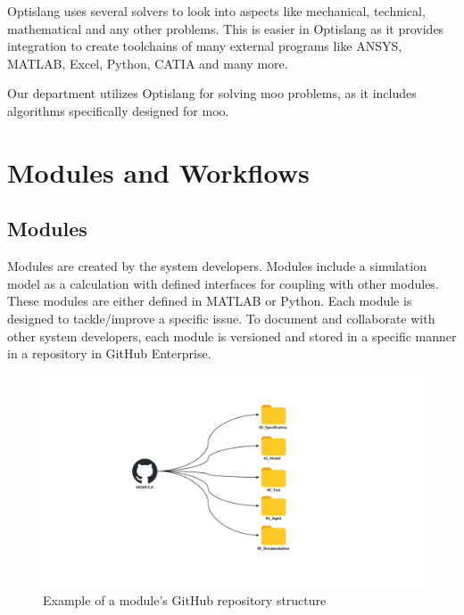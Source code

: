 Optislang uses several solvers to look into aspects like mechanical, technical, mathematical and any other problems. This is easier in Optislang as it provides
integration to create toolchains of many external programs like ANSYS, MATLAB, Excel, Python, CATIA and many more.


Our department utilizes Optislang for solving \acrshort{moo} problems, as it includes algorithms specifically designed for \acrshort{moo}.
\section{Modules and Workflows}
\subsection{Modules}
Modules are created by the system developers. Modules include a simulation model as a calculation with defined interfaces for coupling with other modules. 
These modules are either defined in MATLAB or Python. Each module is designed to tackle/improve a specific issue. To document and collaborate with other
system developers, each module is versioned and stored in a specific manner in a repository in GitHub Enterprise.

\begin{figure}[!h]
    \centering
    \includegraphics[width=1.2\textwidth]{Images/github_folder_structure.pdf}
    \caption{Example of a module's GitHub repository structure}
    \label{github_arrhenius}
\end{figure}

